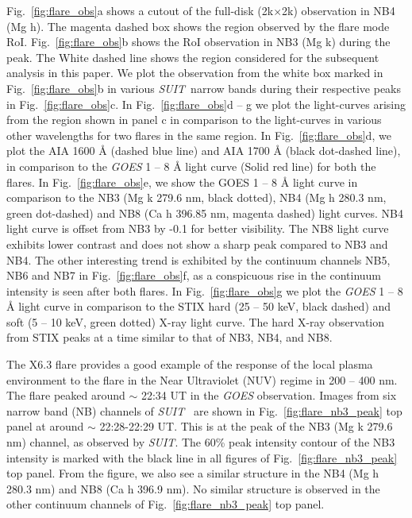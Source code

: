 \documentclass[lineno, pdflatex,sn-mathphys-ay]{sn-jnl}%
\newcommand{\suit}{{\it{SUIT}}}
\begin{document}
Fig.~\ref{fig:flare_obs}a shows a cutout of the full-disk (2k$\times$2k) observation in NB4 (Mg  h). The magenta dashed box shows the region observed by the flare mode RoI. Fig.~\ref{fig:flare_obs}b shows the RoI observation in NB3 (Mg  k) during the peak. The White dashed line shows the region considered for the subsequent analysis in this paper. We plot the observation from the white box marked in Fig.~\ref{fig:flare_obs}b in various \suit~narrow bands during their respective peaks in Fig.~\ref{fig:flare_obs}c. In Fig.~\ref{fig:flare_obs}d {--} g we plot the light-curves arising from the region shown in panel c in comparison to the light-curves in various other wavelengths for two flares in the same region. In Fig.~\ref{fig:flare_obs}d, we plot the AIA 1600 {\AA} (dashed blue line) and AIA 1700 {\AA} (black dot-dashed line), in comparison to the {\it GOES} 1 {--} 8 {\AA} light curve (Solid red line) for both the flares. In Fig.~\ref{fig:flare_obs}e, we show the GOES 1 {--} 8 {\AA} light curve in comparison to the NB3 (Mg  k 279.6 nm, black dotted), NB4 (Mg  h 280.3 nm, green dot-dashed) and NB8 (Ca  h 396.85 nm, magenta dashed) light curves. NB4 light curve is offset from NB3 by -0.1 for better visibility. The NB8 light curve exhibits lower contrast and does not show a sharp peak compared to NB3 and NB4. The other interesting trend is exhibited by the continuum channels NB5, NB6 and NB7 in Fig.~\ref{fig:flare_obs}f, as a conspicuous rise in the continuum intensity is seen after both flares. In Fig.~\ref{fig:flare_obs}g we plot the {\it GOES} 1 {--} 8 {\AA} light curve in comparison to the STIX hard (25 {--} 50 keV, black dashed) and soft (5 {--} 10 keV, green dotted) X-ray light curve. The hard X-ray observation from STIX peaks at a time similar to that of NB3, NB4, and NB8.

The X6.3 flare provides a good example of the response of the local plasma environment to the flare in the Near Ultraviolet (NUV) regime in 200 {--} 400 nm. The flare peaked around $\sim$ 22:34 UT in the {\it GOES} observation. Images from six narrow band (NB) channels of \suit~ are shown in Fig.~\ref{fig:flare_nb3_peak} top panel at around $\sim$ 22:28-22:29 UT. This is at the peak of the NB3 (Mg  k 279.6 nm) channel, as observed by \suit. The 60\% peak intensity contour of the NB3 intensity is marked with the black line in all figures of Fig.~\ref{fig:flare_nb3_peak} top panel. From the figure, we also see a similar structure in the NB4 (Mg  h 280.3 nm) and NB8 (Ca  h 396.9 nm). No similar structure is observed in the other continuum channels of Fig.~\ref{fig:flare_nb3_peak} top panel.
\end{document}
